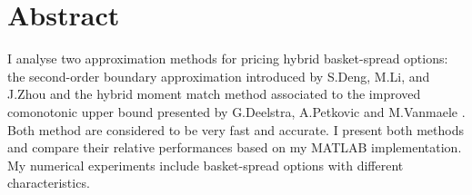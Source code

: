 \documentclass[a4paper]{article}
\begin{document}
\section*{Abstract}
I analyse two approximation methods for pricing hybrid basket-spread options: the second-order boundary approximation introduced by S.Deng, M.Li, and J.Zhou \cite{sob} and the hybrid moment match method associated to the improved comonotonic upper bound presented by G.Deelstra, A.Petkovic and M.Vanmaele \cite{hybmmicub}. Both method are considered to be very fast and accurate. I present both methods and compare their relative performances based on my MATLAB implementation. My numerical experiments include basket-spread options with different characteristics.

\newpage

\renewcommand{\cftsecleader}{\cftdotfill{\cftdotsep}}
\tableofcontents

\newpage
{}
\setcounter{page}{1}
\end{document}
